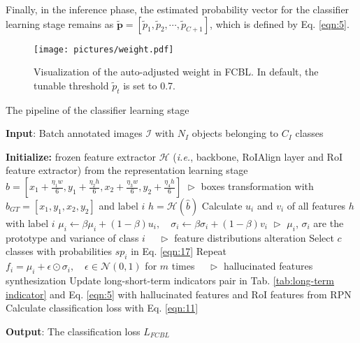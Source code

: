 \documentclass[lettersize,journal]{IEEEtran}
\begin{document}
Finally, in the inference phase, the estimated probability vector for the classifier learning stage remains as $\tilde{\bm{p}}=[\tilde{p}_1, \tilde{p}_2, \cdots, \tilde{p}_{C+1}]$, which is defined by Eq. \eqref{eqn:5}.

\begin{figure}
    \centering
    \texttt{[image: pictures/weight.pdf]}
    \caption{Visualization of the auto-adjusted weight in FCBL. In default, the tunable threshold $\tilde{p}_{t}$ is set to 0.7.}
    \label{pic:4}
\end{figure}



















\begin{algorithm}[t]
    \caption{The pipeline of the classifier learning stage}
    \label{alg:algorithm}
    \textbf{Input}: Batch annotated images $\mathcal{I}$ with $N_I$ objects belonging to $C_I$ classes


    \begin{algorithmic}[1] \STATE \textbf{Initialize:} frozen feature extractor $\mathcal{H}$ ({\em i.e.}, backbone, RoIAlign layer and RoI feature extractor) from the representation learning stage
    \STATE $\hat{b}=[x_1+\frac{\eta_1 w}{6},y_1+\frac{\eta_2 h}{6}, x_2+\frac{\eta_3 w}{6},y_2+\frac{\eta_4 h}{6}]$  $\vartriangleright$ boxes transformation with $b_{GT}=[x_1,y_1,x_2,y_2]$ and label $i$
    \STATE $h=\mathcal{H}(\hat{b})$
    \ENDFOR
    \STATE Calculate $u_{i}$ and $v_{i}$ of all features $h$ with label $i$
    \STATE $\mu_{i}\leftarrow \beta\mu_{i}+(1-\beta)u_i,\quad \sigma_{i}\leftarrow \beta\sigma_{i}+(1-\beta)v_i$ $\vartriangleright$ $\mu_{i}$, $\sigma_{i}$ are the prototype and variance of class $i$
    \ENDFOR $\quad\vartriangleright$ feature distributions alteration
    \STATE Select $c$ classes with probabilities $sp_i$ in Eq. \eqref{eqn:17}
    \STATE Repeat $f_i=\mu_i+\epsilon\odot\sigma_i, \quad \epsilon\in \mathcal{N}(0,1)$ for $m$ times
    \ENDFOR $\quad\vartriangleright$ hallucinated features synthesization
    \STATE Update long-short-term indicators pair in Tab. \ref{tab:long-term indicator} and Eq. \eqref{eqn:5} with hallucinated features and RoI features from RPN
    \vspace{-4mm}
    \STATE Calculate classification loss with Eq. \eqref{eqn:11}
    \end{algorithmic}
    \textbf{Output}: The classification loss $L_{FCBL}$
\end{algorithm}
\end{document}
